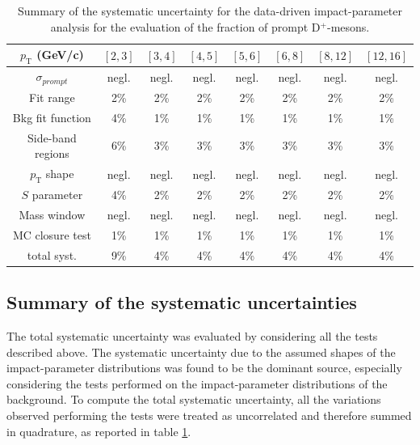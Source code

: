 \documentclass[b5paper,10pt,twoside,oldstyle,classica]{toptesi}
\newcommand{\pt}{p_\text{T}}
\begin{document}
\begin{table}[b]
\centering 
\begin{center} %
\renewcommand\arraystretch{1.1} 
\begin{tabular}{|c|c|c|c|c|c|c|c|}
\hline
$\pt$ (GeV/c) & $[2,3]$ & $[3,4]$ & $[4,5]$ & $[5,6]$ & $[6,8]$ & $[8,12]$ & $[12,16]$\\
\hline
$\sigma_{prompt}$ & negl. & negl. & negl. & negl. & negl. & negl. & negl.\\
Fit range & 2\% & 2\% & 2\% & 2\% & 2\% & 2\% & 2\%\\
Bkg fit function & 4\% & 1\% & 1\% & 1\% & 1\% & 1\% & 1\%\\
Side-band regions & 6\% & 3\% & 3\% & 3\% & 3\% & 3\% & 3\%\\
$\pt$ shape & negl. & negl. & negl. & negl. & negl. & negl. & negl.\\
$S$ parameter & 4\% & 2\% & 2\% & 2\% & 2\% & 2\% & 2\%\\
Mass window & negl. & negl. & negl. & negl. & negl. & negl. & negl.\\
MC closure test & 1\% & 1\% & 1\% & 1\% & 1\% & 1\% & 1\%\\
\hline
total syst. & 9\% & 4\% & 4\% & 4\% & 4\% & 4\% & 4\%\\
\hline
\end{tabular}
\caption{Summary of the systematic uncertainty for the data-driven impact-parameter analysis for the evaluation of the fraction of prompt D$^+$-mesons.}
\label{IP_syst}
\end{center} 
\end{table}
\subsection{Summary of the systematic uncertainties}
The total systematic uncertainty was evaluated by considering all the tests described above. The systematic uncertainty due to the assumed shapes of the impact-parameter distributions was found to be the dominant source, especially considering the tests performed on the impact-parameter distributions of the background. To compute the total systematic uncertainty, all the variations observed performing the tests were treated as uncorrelated and therefore summed in quadrature, as reported in table \ref{IP_syst}. 
\end{document}
